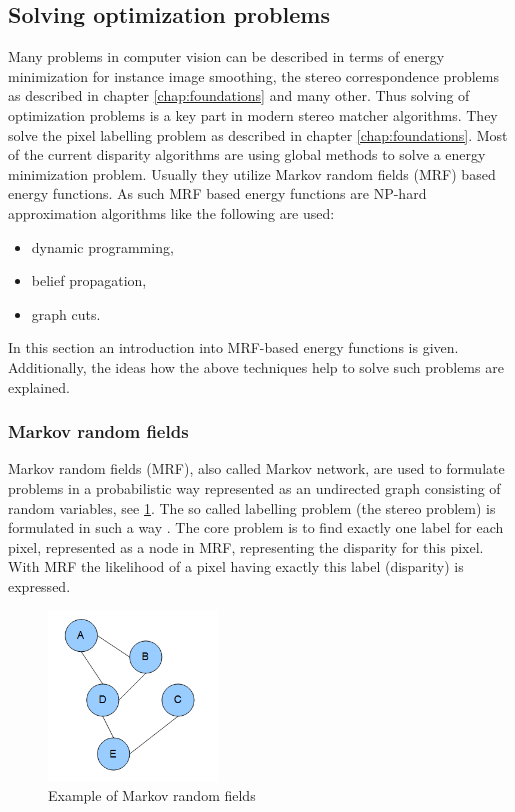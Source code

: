 \subsection{Solving optimization problems}

Many problems in computer vision can be described in terms of energy minimization for instance image smoothing, the stereo correspondence problems as described in chapter \ref{chap:foundations} and many other.
Thus solving of optimization problems is a key part in modern stereo matcher algorithms.
They solve the pixel labelling problem as described in chapter \ref{chap:foundations}.
Most of the current disparity algorithms are using global methods to solve a energy minimization problem.
Usually they utilize Markov random fields (MRF) based energy functions.
As such MRF based energy functions are NP-hard approximation algorithms like the following are used:

\begin{itemize}
  \item dynamic programming,
  \item belief propagation,
  \item graph cuts.
\end{itemize}

\noindent In this section an introduction into MRF-based energy functions is given.
Additionally, the ideas how the above techniques help to solve such problems are explained.

\subsubsection{Markov random fields}

Markov random fields (MRF), also called Markov network, are used to formulate problems in a probabilistic way represented as an undirected graph consisting of random variables, see \ref{fig:markov}.
The so called labelling problem (the stereo problem) is formulated in such a way \citep{tamassia2013handbook}.
The core problem is to find exactly one label for each pixel, represented as a node in MRF, representing the disparity for this pixel.
With MRF the likelihood of a pixel having exactly this label (disparity) is expressed.

\begin{figure}[h!]
  \centering
  \includegraphics[width=0.4\textwidth]{src/images/mrf-example.png}
  \caption[Example of Markov random fields]{Example of Markov random fields\protect\footnotemark}
  \label{fig:markov}
\end{figure}

